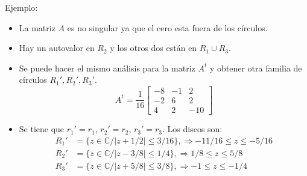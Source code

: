 \documentclass[11pt]{beamer}
\begin{document}
    \begin{frame}{Ejemplo:}
      \begin{itemize}
        \item La matriz $A$ es no singular ya que el cero esta fuera de los c\'irculos.
        \item Hay un autovalor en $R_2$ y los otros dos est\'an en $R_1 \cup R_3$.
        \item Se puede hacer el mismo an\'alisis para la matriz $A^t$ y obtener otra familia de c\'irculos $R_1',R_2', R_3'$.
        $$
        A^t = \dfrac{1}{16}\left[\begin{array}{ccc}
          -8 & -1 & 2 \\
          -2 & 6 & 2 \\
          4 & 2 & -10      
        \end{array}\right]
        $$
        \item Se tiene que $r_1' = r_1$, $r_2' = r_2$, $r_3' = r_3$. Los discos son:
        \begin{align*}
        R_1' & = \{ z \in \mathbb{C} / |z+1/2|\leq 3/16\}, \Rightarrow -11/16 \leq z \leq -5/16\\
        R_2' & = \{ z \in \mathbb{C} / |z-3/8|\leq 1/4\}, \Rightarrow 1/8 \leq z \leq 5/8\\
        R_3' & = \{ z \in \mathbb{C} / |z+5/8|\leq 3/8\}, \Rightarrow -1 \leq z \leq -1/4
        \end{align*}
      \end{itemize}
    \end{frame}
\end{document}
